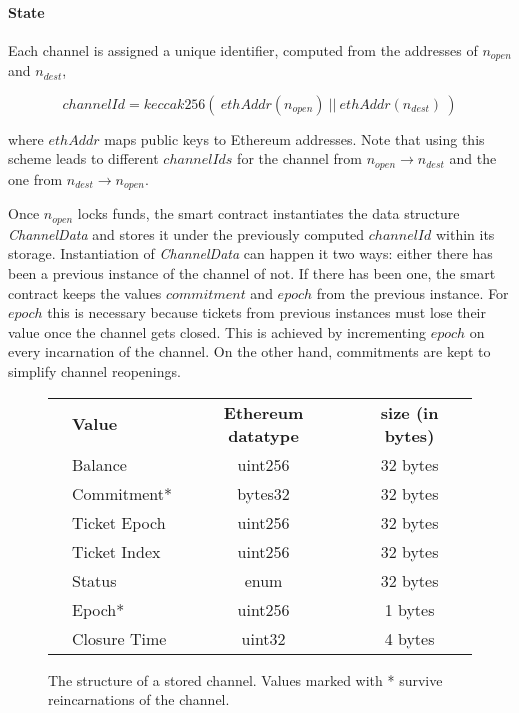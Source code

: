 \paragraph{State}

Each channel is assigned a unique identifier, computed from the addresses of $n_{open}$ and $n_{dest}$,

$$ channelId = keccak256 (\ ethAddr(n_{open}) \ || \ ethAddr(n_{dest}) \ ) $$

where $ethAddr$ maps public keys to Ethereum addresses. Note that using this scheme leads to different $channelIds$ for the channel from $n_{open} \rightarrow n_{dest}$ and the one from $n_{dest} \rightarrow n_{open}$.

Once $n_{open}$ locks funds, the smart contract instantiates the data structure \textit{ChannelData} and stores it under the previously computed $channelId$ within its storage. Instantiation of \textit{ChannelData} can happen it two ways: either there has been a previous instance of the channel of not. If there has been one, the smart contract keeps the values $commitment$ and $epoch$ from the previous instance. For $epoch$ this is necessary because tickets from previous instances must lose their value once the channel gets closed. This is achieved by incrementing $epoch$ on every incarnation of the channel. On the other hand, commitments are kept to simplify channel reopenings.

\begin{figure}[H]
    \centering
    \begin{tabular}{c|l|c|c|}
        \cline{2-4}
                                                     & \textbf{Value} & \textbf{Ethereum datatype} & \textbf{size (in bytes)} \\
        \cline{2-4}
        \noalign{\smallskip}
        \cline{2-4}
        \multirow{7}{*}{\rotatebox{90}{ChannelData}} & Balance        & uint256                    & 32 bytes                 \\
                                                     & Commitment*    & bytes32                    & 32 bytes                 \\
                                                     & Ticket Epoch   & uint256                    & 32 bytes                 \\
                                                     & Ticket Index   & uint256                    & 32 bytes                 \\
                                                     & Status         & enum                       & 32 bytes                 \\
                                                     & Epoch*         & uint256                    & 1 bytes                  \\
                                                     & Closure Time   & uint32                     & 4 bytes                  \\
        \cline{2-4}
    \end{tabular}
    \caption{The structure of a stored channel. Values marked with * survive reincarnations of the channel.}
    \label{fig:channeldata}
\end{figure}

